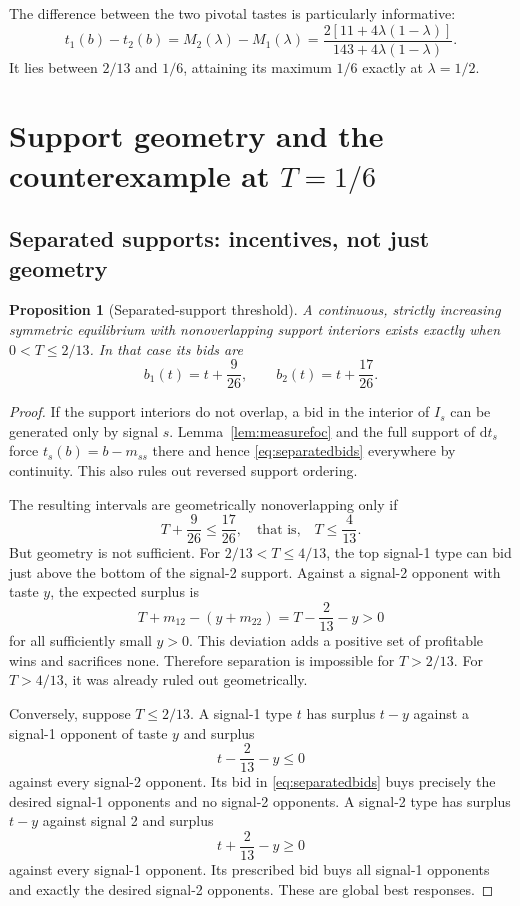 \documentclass[11pt,a4paper]{article}
\numberwithin{equation}{section}
\newtheorem{proposition}[theorem]{Proposition}
\theoremstyle{definition}
\theoremstyle{remark}
\begin{document}
The difference between the two pivotal tastes is particularly informative:
\begin{equation}
\label{eq:meangap}
 t_1(b)-t_2(b)
 =M_2(\lambda)-M_1(\lambda)
 =\frac{2[11+4\lambda(1-\lambda)]}{143+4\lambda(1-\lambda)}.
\end{equation}
It lies between $2/13$ and $1/6$, attaining its maximum $1/6$ exactly at $\lambda=1/2$.

\section{Support geometry and the counterexample at \texorpdfstring{$T=1/6$}{T=1/6}}
\label{sec:geometry}

\subsection{Separated supports: incentives, not just geometry}
\begin{proposition}[Separated-support threshold]
\label{prop:separation}
A continuous, strictly increasing symmetric equilibrium with nonoverlapping support interiors exists exactly when $0<T\le2/13$. In that case its bids are
\begin{equation}
\label{eq:separatedbids}
 b_1(t)=t+\frac9{26},\qquad b_2(t)=t+\frac{17}{26}.
\end{equation}
\end{proposition}
\begin{proof}
If the support interiors do not overlap, a bid in the interior of $I_s$ can be generated only by signal $s$. Lemma~\ref{lem:measurefoc} and the full support of $\mathrm dt_s$ force $t_s(b)=b-m_{ss}$ there and hence \eqref{eq:separatedbids} everywhere by continuity. This also rules out reversed support ordering.

The resulting intervals are geometrically nonoverlapping only if
\[
 T+\frac9{26}\le\frac{17}{26},\quad\text{that is,}\quad T\le\frac4{13}.
\]
But geometry is not sufficient. For $2/13<T\le4/13$, the top signal-1 type can bid just above the bottom of the signal-2 support. Against a signal-2 opponent with taste $y$, the expected surplus is
\[
 T+m_{12}-(y+m_{22})=T-\frac2{13}-y>0
\]
for all sufficiently small $y>0$. This deviation adds a positive set of profitable wins and sacrifices none. Therefore separation is impossible for $T>2/13$. For $T>4/13$, it was already ruled out geometrically.

Conversely, suppose $T\le2/13$. A signal-1 type $t$ has surplus $t-y$ against a signal-1 opponent of taste $y$ and surplus
\[
 t-\frac2{13}-y\le0
\]
against every signal-2 opponent. Its bid in \eqref{eq:separatedbids} buys precisely the desired signal-1 opponents and no signal-2 opponents. A signal-2 type has surplus $t-y$ against signal 2 and surplus
\[
 t+\frac2{13}-y\ge0
\]
against every signal-1 opponent. Its prescribed bid buys all signal-1 opponents and exactly the desired signal-2 opponents. These are global best responses.
\end{proof}
\end{document}

